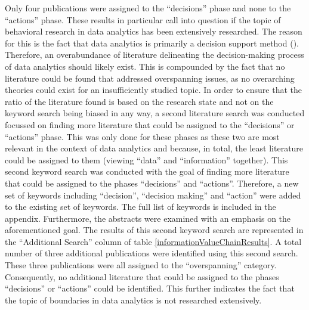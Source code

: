 Only four publications were assigned to the \enquote{decisions} phase and none to the \enquote{actions} phase. These results in particular call into question if the topic of behavioral research in data analytics has been extensively researched. The reason for this is the fact that data analytics is primarily a decision support method (\cite{Runkler.2020}). Therefore, an overabundance of literature delineating the decision-making process of data analytics should likely exist. This is compounded by the fact that no literature could be found that addressed overspanning issues, as no overarching theories could exist for an insufficiently studied topic. In order to ensure that the ratio of the literature found is based on the research state and not on the keyword search being biased in any way, a second literature search was conducted focussed on finding more literature that could be assigned to the \enquote{decisions} or \enquote{actions} phase. This was only done for these phases as these two are most relevant in the context of data analytics and because, in total, the least literature could be assigned to them (viewing \enquote{data} and  \enquote{information} together). This second keyword search was conducted with the goal of finding more literature that could be assigned to the phases \enquote{decisions} and \enquote{actions}. Therefore, a new set of keywords including \enquote{decision}, \enquote{decision making} and \enquote{action} were added to the existing set of keywords. The full list of keywords is included in the appendix. Furthermore, the abstracts were examined with an emphasis on the aforementioned goal. The results of this second keyword search are represented in the \enquote{Additional Search} column of table \ref{informationValueChainResults}. A total number of three additional publications were identified using this second search. These three publications were all assigned to the \enquote{overspanning} category. Consequently, no additional literature that could be assigned to the phases \enquote{decisions} or \enquote{actions} could be identified. This further indicates the fact that the topic of boundaries in data analytics is not researched extensively. 



